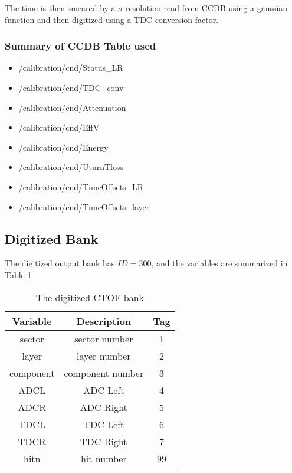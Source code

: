 The time is then smeared by a $\sigma$ resolution read from CCDB using a gaussian function and then digitized using a TDC conversion factor.


\subsubsection{Summary of CCDB Table used}
\begin{itemize}
	\item /calibration/cnd/Status_LR
	\item /calibration/cnd/TDC\_conv
	\item /calibration/cnd/Attenuation
	\item /calibration/cnd/EffV
	\item /calibration/cnd/Energy
	\item /calibration/cnd/UturnTloss
	\item /calibration/cnd/TimeOffsets\_LR
	\item /calibration/cnd/TimeOffsets\_layer
\end{itemize}



\subsection{Digitized Bank}
The digitized output bank has $ID=300$, and the variables are summarized in Table \ref{tab:cndBank}

\begin{table}[h]
	\begin{center}
		\begin{tabular}{| c | c | c |}
			\hline \hline
			Variable         & Description  & Tag  \\
			\hline
              sector  &                                     sector number  &    1   \\
               layer  &                                      layer number  &    2   \\
           component  &                                  component number  &    3   \\
                ADCL  &                                          ADC Left  &    4   \\
                ADCR  &                                         ADC Right  &    5   \\
                TDCL  &                                          TDC Left  &    6   \\
                TDCR  &                                         TDC Right  &    7   \\
                hitn  &                                        hit number  &   99   \\
			\hline \hline
		\end{tabular}
	\end{center}
	\caption{The digitized CTOF bank}\label{tab:cndBank}
\end{table}


